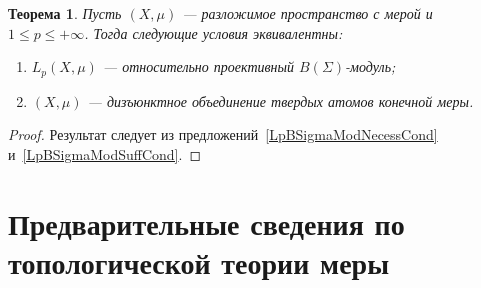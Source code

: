 \documentclass[12pt]{article}
\newtheorem{theorem}{Теорема}[section]
\begin{document}
\begin{theorem}\label{LpBSigmaModCrit} Пусть $(X,\mu)$ --- разложимое
    пространство с мерой и $1\leq p\leq +\infty$. Тогда следующие условия
    эквивалентны:
    \begin{enumerate}[label = (\roman*)]
        \item $L_p(X,\mu)$ --- относительно проективный $B(\Sigma)$-модуль;

        \item $(X,\mu)$ --- дизъюнктное объединение твердых атомов конечной
              меры.
    \end{enumerate}
\end{theorem}
\begin{proof} Результат следует из предложений~\ref{LpBSigmaModNecessCond}
    и~\ref{LpBSigmaModSuffCond}.
\end{proof}


\section{Предварительные сведения по топологической теории
  меры}\label{SectionPreliminariesOnTopologicalMeasureTheory}
\end{document}
